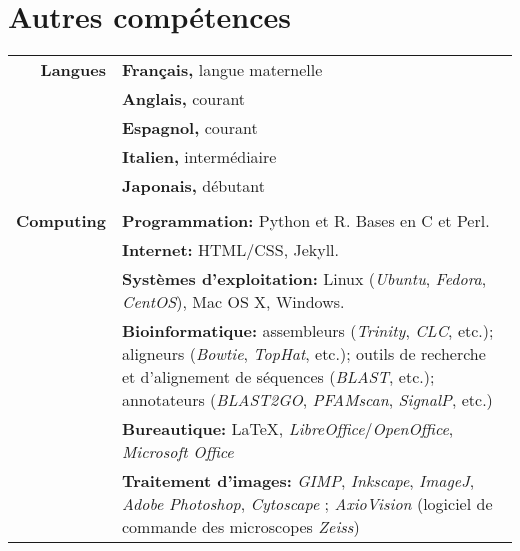 \documentclass[letterpaper,10pt]{article}
\begin{document}
\section{Autres compétences}
\begin{tabular}{r|p{13cm}}

\textbf{Langues}
& \textbf{Français,} langue maternelle \\
& \textbf{Anglais,} courant \\
& \textbf{Espagnol,} courant \\
& \textbf{Italien,} intermédiaire \\
& \textbf{Japonais,} débutant \\

\multicolumn{2}{c}{} \\

\textbf{Computing}

& \textbf{Programmation:} Python et R. Bases en C et Perl.
  \vspace{2mm} \\

& \textbf{Internet:} HTML/CSS, Jekyll.
  \vspace{2mm} \\

& \textbf{Systèmes d’exploitation:} Linux (\emph{Ubuntu}, \emph{Fedora},
  \emph{CentOS}), Mac OS X, Windows.
  \vspace{2mm} \\

& \textbf{Bioinformatique:} assembleurs (\emph{Trinity}, \emph{CLC}, etc.);
  aligneurs (\emph{Bowtie}, \emph{TopHat}, etc.);
  outils de recherche et d’alignement de séquences (\emph{BLAST}, etc.);
  annotateurs (\emph{BLAST2GO}, \emph{PFAMscan}, \emph{SignalP}, etc.)
  \vspace{2mm} \\

& \textbf{Bureautique:} \LaTeX, \emph{LibreOffice}/\emph{OpenOffice},
  \emph{Microsoft Office}
  \vspace{2mm} \\

& \textbf{Traitement d’images:} \emph{GIMP}, \emph{Inkscape}, \emph{ImageJ},
  \emph{Adobe Photoshop}, \emph{Cytoscape} ; \emph{AxioVision} (logiciel de commande des microscopes \emph{Zeiss}) \\

\end{tabular}
\end{document}
